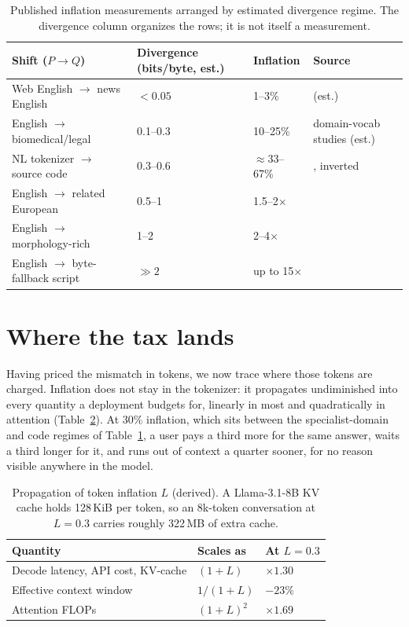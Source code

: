 \documentclass{article}
\begin{document}
\begin{table}[t]
\centering
\small
\begin{tabular}{@{}p{4.2cm}p{2.1cm}p{1.9cm}p{4.2cm}@{}}
\toprule
Shift ($P \to Q$) & Divergence (bits/byte, est.) & Inflation & Source \\
\midrule
Web English $\to$ news English & $<0.05$ & 1--3\% & (est.) \\
English $\to$ biomedical/legal & 0.1--0.3 & 10--25\% & domain-vocab studies (est.) \\
NL tokenizer $\to$ source code & 0.3--0.6 & $\approx$33--67\% & \citep{dagan2024tokenizer}, inverted \\
English $\to$ related European & 0.5--1 & 1.5--2$\times$ & \citep{petrov2023language} \\
English $\to$ morphology-rich & 1--2 & 2--4$\times$ & \citep{petrov2023language,rust2021tokenizer} \\
English $\to$ byte-fallback script & $\gg 2$ & up to 15$\times$ & \citep{petrov2023language} \\
\bottomrule
\end{tabular}
\caption{Published inflation measurements arranged by estimated divergence regime. The divergence column organizes the rows; it is not itself a measurement.}
\label{tab:calibration}
\end{table}

\section{Where the tax lands}
\label{sec:propagation}

Having priced the mismatch in tokens, we now trace where those tokens are charged. Inflation does not stay in the tokenizer: it propagates undiminished into every quantity a deployment budgets for, linearly in most and quadratically in attention (Table~\ref{tab:propagation}). At 30\% inflation, which sits between the specialist-domain and code regimes of Table~\ref{tab:calibration}, a user pays a third more for the same answer, waits a third longer for it, and runs out of context a quarter sooner, for no reason visible anywhere in the model.

\begin{table}[t]
\centering
\small
\begin{tabular}{@{}lll@{}}
\toprule
Quantity & Scales as & At $L = 0.3$ \\
\midrule
Decode latency, API cost, KV-cache & $(1+L)$ & $\times 1.30$ \\
Effective context window & $1/(1+L)$ & $-23\%$ \\
Attention FLOPs & $(1+L)^2$ & $\times 1.69$ \\
\bottomrule
\end{tabular}
\caption{Propagation of token inflation $L$ (derived). A Llama-3.1-8B KV cache holds 128\,KiB per token, so an 8k-token conversation at $L = 0.3$ carries roughly 322\,MB of extra cache.}
\label{tab:propagation}
\end{table}
\end{document}
